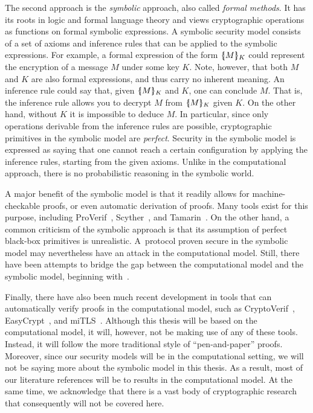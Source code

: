 The second approach is the \emph{symbolic} approach,
also called \emph{formal methods}.
It has its roots in logic and formal language theory and views cryptographic operations as functions on formal symbolic expressions.
A symbolic security model consists of a set of axioms and inference rules that can be applied to the symbolic expressions.
For example,
a formal expression of the form $\symbolicencrypt{M}_K$ could represent the encryption of a message $M$ under some key $K$.
Note,
however,
that both $M$ and $K$ are also formal expressions,
and thus carry no inherent meaning.
An inference rule could say that,
given $\symbolicencrypt{M}_K$ and $K$,
one can conclude $M$.
That is,
the inference rule allows you to decrypt $M$ from  $\symbolicencrypt{M}_K$  given $K$. 
On the other hand,
without $K$ it is impossible to deduce $M$.
In particular,
since only operations derivable from the inference rules are possible,
cryptographic primitives in the symbolic model are \emph{perfect}.
Security in the symbolic model is expressed as saying that one cannot reach a certain configuration by applying the inference rules,
starting from the given axioms.
Unlike in the computational approach,
there is no probabilistic reasoning in the symbolic world.

A major benefit of the symbolic model is that it readily allows for machine-checkable proofs,
or even automatic derivation of proofs.
Many tools exist for this purpose,
including ProVerif~\cite{Blanchet:2016:ProVerif}, Scyther~\cite{Cremers:2008:Scyther}, and Tamarin~\cite{MeierSCB:2013:Tamarin}.
On the other hand,
a common criticism of the symbolic approach is that its assumption of perfect black-box primitives is unrealistic.
A~protocol proven secure in the symbolic model may nevertheless have an attack in the computational model.
Still,
there have been attempts to bridge the gap between the computational model and the symbolic model,
beginning with~\cite{AbadiR:2000:two_views}.

Finally,
there have also been much recent development in tools that can automatically verify proofs in the computational model,
such as CryptoVerif~\cite{Blanchet:2008:CryptoVerif},
EasyCrypt~\cite{BartheDGKSS:2013:EasyCrypt},
and miTLS~\cite{SP:BFKPS13}.
Although this thesis will be based on the computational model,
it will,
however,
not be making use of any of these tools.
Instead,
it will follow the more traditional style of ``pen-and-paper'' proofs.
Moreover,
since our security models will be in the computational setting,
we will not be saying more about the symbolic model in this thesis.
As a result,
most of our literature references will be to results in the computational model.
At the same time,
we acknowledge that there is a vast body of cryptographic research that consequently will not be covered here.




